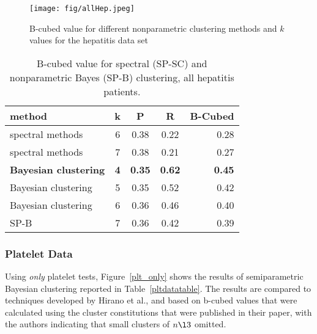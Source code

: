 \begin{figure}[ht]
\vskip 0.2in
\begin{center}
\centerline{\texttt{[image: fig/allHep.jpeg]}}
\caption{B-cubed value for different nonparametric clustering methods and $k$ values for the hepatitis data set}
\label{allHep}
\end{center}
\vskip -0.2in
\end{figure}


\begin{table}[ht]
\caption{B-cubed value for spectral (SP-SC) and nonparametric Bayes (SP-B) clustering, all hepatitis patients.}
\label{allHepTable}
\vskip 0.15in
\begin{center}
\begin{small}
\begin{sc}
\begin{tabular}{lcccr}
\hline
\hline
method	& k	& P	& R	& B-Cubed \\
\hline
\hline
spectral methods & 6	& 0.38& 0.22& 0.28\\
spectral methods	         & 7	& 0.38& 0.21& 0.27\\
\textbf{Bayesian clustering}       & \textbf{4}	& \textbf{0.35}& \textbf{0.62}& \textbf{0.45}\\
Bayesian clustering	     & 5	& 0.35& 0.52& 0.42\\
Bayesian clustering	     & 6	& 0.36& 0.46& 0.40\\
\hline

SP-B	     & 7	& 0.36& 0.42& 0.39\\
\hline
\end{tabular}
\end{sc}
\end{small}
\end{center}
\vskip -0.1in
\end{table}



\subsubsection{Platelet Data}
Using \emph{only} platelet tests, Figure~\ref{plt_only} shows the results of semiparametric Bayesian clustering reported in Table~\ref{pltdatatable}.  The results are compared to techniques developed by Hirano et al.\cite{Hirano05}, and based on b-cubed values that were calculated using the cluster constitutions that were published in their paper, with the authors indicating that small clusters of $n \l 3$ omitted.

